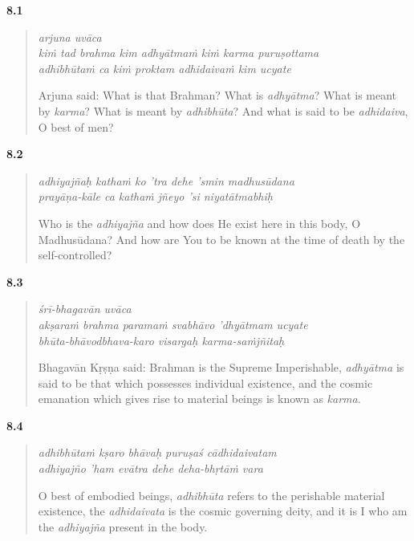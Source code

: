 \par\noindent\textbf{8.1}\par
\begin{verse}
\textit{arjuna uvāca} \\
\textit{kiṁ tad brahma kim adhyātmaṁ kiṁ karma puruṣottama} \\
\textit{adhibhūtaṁ ca kiṁ proktam adhidaivaṁ kim ucyate}

\noindent Arjuna said: What is that Brahman? What is \textit{adhyātma}? What is meant by \textit{karma}? What is meant by \textit{adhibhūta}? And what is said to be \textit{adhidaiva}, O best of men?
\end{verse}
\par



\par\noindent\textbf{8.2}\par
\begin{verse}
\textit{adhiyajñaḥ kathaṁ ko ’tra dehe ’smin madhusūdana} \\
\textit{prayāṇa-kāle ca kathaṁ jñeyo ’si niyatātmabhiḥ}

\noindent Who is the \textit{adhiyajña} and how does He exist here in this body, O Madhusūdana? And how are You to be known at the time of death by the self-controlled?
\end{verse}
\par



\par\noindent\textbf{8.3}\par
\begin{verse}
\textit{śrī-bhagavān uvāca} \\
\textit{akṣaraṁ brahma paramaṁ svabhāvo ’dhyātmam ucyate} \\
\textit{bhūta-bhāvodbhava-karo visargaḥ karma-saṁjñitaḥ}

\noindent Bhagavān Kṛṣṇa said: Brahman is the Supreme Imperishable, \textit{adhyātma} is said to be that which possesses individual existence, and the cosmic emanation which gives rise to material beings is known as \textit{karma}.
\end{verse}
\par



\par\noindent\textbf{8.4}\par
\begin{verse}
\textit{adhibhūtaṁ kṣaro bhāvaḥ puruṣaś cādhidaivatam} \\
\textit{adhiyajño ’ham evātra dehe deha-bhṛtāṁ vara}

\noindent O best of embodied beings, \textit{adhibhūta} refers to the perishable material existence, the \textit{adhidaivata} is the cosmic governing deity, and it is I who am the \textit{adhiyajña} present in the body.
\end{verse}
\par




